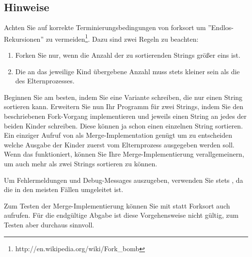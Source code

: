 \subsection*{Hinweise}
Achten Sie auf korrekte Terminierungsbedingungen von forksort um ''Endlos-Rekursionen'' zu vermeiden\footnote{http://en.wikipedia.org/wiki/Fork\_bomb}.
Dazu sind zwei Regeln zu beachten:
\begin{enumerate}
\item Forken Sie nur, wenn die Anzahl der zu sortierenden Strings größer eins ist.
\item Die an das jeweilige Kind übergebene Anzahl muss stets kleiner sein als
  die des Elternprozesses.
\end{enumerate}
Beginnen Sie am besten, indem Sie eine Variante schreiben, die nur einen String
sortieren kann. Erweitern Sie nun Ihr Programm für zwei Strings, indem Sie den beschriebenen
Fork-Vorgang implementieren und jeweils einen String an jedes der beiden Kinder schreiben. Diese
können ja schon einen einzelnen String sortieren. Ein einziger Aufruf von
 als Merge-Implementation gen{\"u}gt um zu entscheiden welche
Ausgabe der Kinder zuerst vom Elternprozess ausgegeben werden soll. Wenn
das funktioniert, können Sie Ihre Merge-Implementierung verallgemeinern, um auch
mehr als zwei Strings sortieren zu können.

Um Fehlermeldungen und Debug-Messages auszugeben, verwenden Sie stets
, da die  in den meisten Fällen umgeleitet ist.

Zum Testen der Merge-Implementierung können Sie mit  statt
Forksort auch  aufrufen. Für die endgültige Abgabe ist diese
Vorgehensweise nicht gültig, zum Testen aber durchaus sinnvoll.

\osueguidelinestwo


